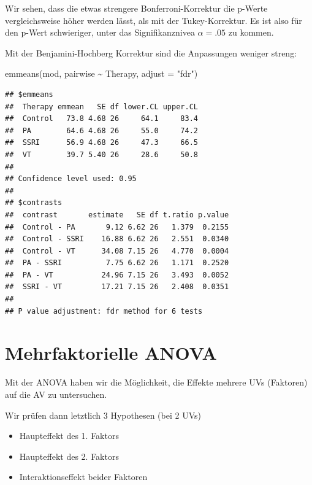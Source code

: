 \documentclass[
]{book}
\newenvironment{Shaded}{\begin{snugshade}}{\end{snugshade}}
\newcommand{\AttributeTok}[1]{\textcolor[rgb]{0.77,0.63,0.00}{#1}}
\newcommand{\FunctionTok}[1]{\textcolor[rgb]{0.00,0.00,0.00}{#1}}
\newcommand{\NormalTok}[1]{#1}
\newcommand{\SpecialCharTok}[1]{\textcolor[rgb]{0.00,0.00,0.00}{#1}}
\newcommand{\StringTok}[1]{\textcolor[rgb]{0.31,0.60,0.02}{#1}}
\providecommand{\tightlist}{%
  \setlength{\itemsep}{0pt}\setlength{\parskip}{0pt}}
\begin{document}
Wir sehen, dass die etwas strengere Bonferroni-Korrektur die p-Werte vergleichsweise höher werden lässt, als mit der Tukey-Korrektur. Es ist also für den p-Wert schwieriger, unter das Signifikanznivea \(\alpha=.05\) zu kommen.

Mit der Benjamini-Hochberg Korrektur sind die Anpassungen weniger streng:

\begin{Shaded}
\begin{Highlighting}[]
\FunctionTok{emmeans}\NormalTok{(mod, pairwise }\SpecialCharTok{\textasciitilde{}}\NormalTok{ Therapy, }\AttributeTok{adjust =} \StringTok{"fdr"}\NormalTok{)}
\end{Highlighting}
\end{Shaded}

\begin{verbatim}
## $emmeans
##  Therapy emmean   SE df lower.CL upper.CL
##  Control   73.8 4.68 26     64.1     83.4
##  PA        64.6 4.68 26     55.0     74.2
##  SSRI      56.9 4.68 26     47.3     66.5
##  VT        39.7 5.40 26     28.6     50.8
## 
## Confidence level used: 0.95 
## 
## $contrasts
##  contrast       estimate   SE df t.ratio p.value
##  Control - PA       9.12 6.62 26   1.379  0.2155
##  Control - SSRI    16.88 6.62 26   2.551  0.0340
##  Control - VT      34.08 7.15 26   4.770  0.0004
##  PA - SSRI          7.75 6.62 26   1.171  0.2520
##  PA - VT           24.96 7.15 26   3.493  0.0052
##  SSRI - VT         17.21 7.15 26   2.408  0.0351
## 
## P value adjustment: fdr method for 6 tests
\end{verbatim}

\hypertarget{mehrfaktorielle-anova}{%
\section{Mehrfaktorielle ANOVA}\label{mehrfaktorielle-anova}}

Mit der ANOVA haben wir die Möglichkeit, die Effekte mehrere UVs (Faktoren) auf die AV zu untersuchen.

Wir prüfen dann letztlich 3 Hypothesen (bei 2 UVs)

\begin{itemize}
\tightlist
\item
  Haupteffekt des 1. Faktors
\item
  Haupteffekt des 2. Faktors
\item
  Interaktionseffekt beider Faktoren
\end{itemize}
\end{document}

